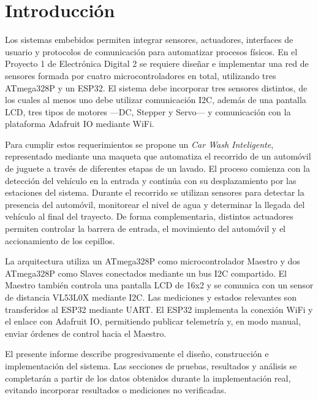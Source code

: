 \section{Introducción}

Los sistemas embebidos permiten integrar sensores, actuadores, interfaces de usuario y protocolos de comunicación para automatizar procesos físicos. En el Proyecto 1 de Electrónica Digital 2 se requiere diseñar e implementar una red de sensores formada por cuatro microcontroladores en total, utilizando tres ATmega328P y un ESP32. El sistema debe incorporar tres sensores distintos, de los cuales al menos uno debe utilizar comunicación I2C, además de una pantalla LCD, tres tipos de motores ---DC, Stepper y Servo--- y comunicación con la plataforma Adafruit IO mediante WiFi.

Para cumplir estos requerimientos se propone un \textit{Car Wash Inteligente}, representado mediante una maqueta que automatiza el recorrido de un automóvil de juguete a través de diferentes etapas de un lavado. El proceso comienza con la detección del vehículo en la entrada y continúa con su desplazamiento por las estaciones del sistema. Durante el recorrido se utilizan sensores para detectar la presencia del automóvil, monitorear el nivel de agua y determinar la llegada del vehículo al final del trayecto. De forma complementaria, distintos actuadores permiten controlar la barrera de entrada, el movimiento del automóvil y el accionamiento de los cepillos.

La arquitectura utiliza un ATmega328P como microcontrolador Maestro y dos ATmega328P como Slaves conectados mediante un bus I2C compartido. El Maestro también controla una pantalla LCD de 16x2 y se comunica con un sensor de distancia VL53L0X mediante I2C. Las mediciones y estados relevantes son transferidos al ESP32 mediante UART. El ESP32 implementa la conexión WiFi y el enlace con Adafruit IO, permitiendo publicar telemetría y, en modo manual, enviar órdenes de control hacia el Maestro.

El presente informe describe progresivamente el diseño, construcción e implementación del sistema. Las secciones de pruebas, resultados y análisis se completarán a partir de los datos obtenidos durante la implementación real, evitando incorporar resultados o mediciones no verificadas.
